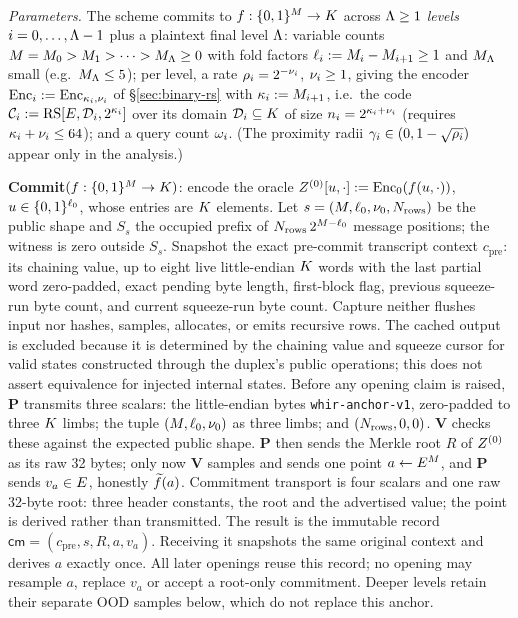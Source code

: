 \begin{protocol}\label{fig:protocol}
\ \par\smallskip
\emph{Parameters.} The scheme commits to $f : \{0,1\}^{M} \to K$ across $\Lambda \ge 1$ \emph{levels} $i = 0, \dots, \Lambda-1$ plus a plaintext final level $\Lambda$: variable counts $M = M_0 > M_1 > \dots > M_\Lambda \ge 0$ with fold factors $\ell_i := M_i - M_{i+1} \ge 1$ and $M_\Lambda$ small (e.g.\ $M_\Lambda \le 5$); per level, a rate $\rho_i = 2^{-\nu_i}$, $\nu_i \ge 1$, giving the encoder $\mathrm{Enc}_i := \mathrm{Enc}_{\kappa_i, \nu_i}$ of \S\ref{sec:binary-rs} with $\kappa_i := M_{i+1}$, i.e.\ the code $\mathcal{C}_i := \mathrm{RS}[E, \mathcal{D}_i, 2^{\kappa_i}]$ over its domain $\mathcal{D}_i \subseteq K$ of size $n_i = 2^{\kappa_i + \nu_i}$ (requires $\kappa_i + \nu_i \le 64$); and a query count $\omega_i$. (The proximity radii $\gamma_i \in (0, 1 - \sqrt{\rho_i})$ appear only in the analysis.)

\smallskip
\textbf{Commit}$(f : \{0,1\}^{M} \to K)$: encode the oracle $Z^{(0)}[u,\cdot]:=\mathrm{Enc}_0(f(u,\cdot))$, $u\in\{0,1\}^{\ell_0}$, whose entries are $K$ elements. Let $s=(M,\ell_0,\nu_0,N_{\mathrm{rows}})$ be the public shape and $S_s$ the occupied prefix of $N_{\mathrm{rows}}\,2^{M-\ell_0}$ message positions; the witness is zero outside $S_s$. Snapshot the exact pre-commit transcript context $c_{\mathrm{pre}}$: its chaining value, up to eight live little-endian $K$ words with the last partial word zero-padded, exact pending byte length, first-block flag, previous squeeze-run byte count, and current squeeze-run byte count. Capture neither flushes input nor hashes, samples, allocates, or emits recursive rows. The cached output is excluded because it is determined by the chaining value and squeeze cursor for valid states constructed through the duplex's public operations; this does not assert equivalence for injected internal states. Before any opening claim is raised, $\mathbf{P}$ transmits three scalars: the little-endian bytes \texttt{whir-anchor-v1}, zero-padded to three $K$ limbs; the tuple $(M,\ell_0,\nu_0)$ as three limbs; and $(N_{\mathrm{rows}},0,0)$. $\mathbf{V}$ checks these against the expected public shape. $\mathbf{P}$ then sends the Merkle root $R$ of $Z^{(0)}$ as its raw 32 bytes; only now $\mathbf{V}$ samples and sends one point $a\leftarrow E^M$, and $\mathbf{P}$ sends $v_a\in E$, honestly $\widetilde{f}(a)$. Commitment transport is four scalars and one raw 32-byte root: three header constants, the root and the advertised value; the point is derived rather than transmitted. The result is the immutable record $\mathsf{cm}=(c_{\mathrm{pre}},s,R,a,v_a)$. Receiving it snapshots the same original context and derives $a$ exactly once. All later openings reuse this record; no opening may resample $a$, replace $v_a$ or accept a root-only commitment. Deeper levels retain their separate OOD samples below, which do not replace this anchor.


\end{protocol}
